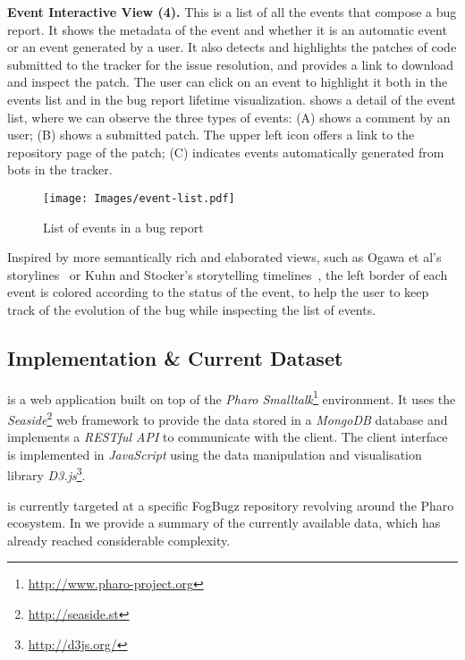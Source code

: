 \textbf{Event Interactive View (4).} This is a list of all the events that compose a bug report. It shows the metadata of the event and whether it is an automatic event or an event generated by a user. It also detects and highlights the patches of code submitted to the tracker for the issue resolution, and provides a link to download and inspect the patch. The user can click on an event to highlight it both in the events list and in the bug report lifetime visualization.  shows a detail of the event list, where we can observe the three types of events: (A) shows a comment by an user; (B) shows a submitted patch. The upper left icon offers a link to the repository page of the patch; (C) indicates events automatically generated from bots in the tracker. \\
\begin{figure}[ht]
\begin{center}
\texttt{[image: Images/event-list.pdf]}
\caption{List of events in a bug report}
\label{fig-event-list}
\end{center}
\end{figure}
\indent{}Inspired by more semantically rich and elaborated views, such as Ogawa et al's storylines~\cite{Ogaw2010a} or Kuhn and Stocker's storytelling timelines~\cite{Kuhn2012a}, the left border of each event is colored according to the status of the event, to help the user to keep track of the evolution of the bug while inspecting the list of events.

\subsection{Implementation \& Current Dataset}

\ib is a web application built on top of the \textit{Pharo Smalltalk}\footnote{\url{http://www.pharo-project.org}} environment. It uses the \textit{Seaside}\footnote{\url{http://seaside.st}} web framework to provide the data stored in a \textit{MongoDB} database and implements a \textit{RESTful API} to communicate with the client. The client interface is implemented in \textit{JavaScript} using the data manipulation and visualisation library \textit{D3.js}\footnote{\url{http://d3js.org/}}.

\ib is currently targeted at a specific FogBugz repository revolving around the Pharo ecosystem. In  we provide a summary of the currently available data, which has already reached considerable complexity.

